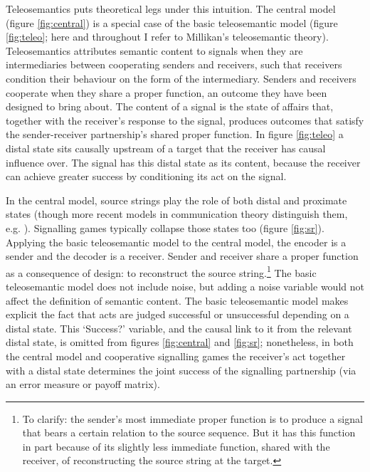 Teleosemantics puts theoretical legs under this intuition.
The central model (figure \ref{fig:central}) is a special case of the basic teleosemantic model (figure \ref{fig:teleo}; here and throughout I refer to Millikan's \parencite*[$\S$6]{millikan2004varieties} teleosemantic theory).
Teleosemantics attributes semantic content to signals when they are intermediaries between cooperating senders and receivers, such that receivers condition their behaviour on the form of the intermediary.
Senders and receivers cooperate when they share a proper function, an outcome they have been designed to bring about.
The content of a signal is the state of affairs that, together with the receiver's response to the signal, produces outcomes that satisfy the sender-receiver partnership's shared proper function.
In figure \ref{fig:teleo} a distal state sits causally upstream of a target that the receiver has causal influence over.
The signal has this distal state as its content, because the receiver can achieve greater success by conditioning its act on the signal.



In the central model, source strings play the role of both distal and proximate states (though more recent models in communication theory distinguish them, e.g. \citet{berger1996ceo}).
Signalling games typically collapse those states too (figure \ref{fig:sr}).
Applying the basic teleosemantic model to the central model, the encoder is a sender and the decoder is a receiver.
Sender and receiver share a proper function as a consequence of design: to reconstruct the source string.\footnote{To clarify: the sender's most immediate proper function is to produce a signal that bears a certain relation to the source sequence. But it has this function in part because of its slightly less immediate function, shared with the receiver, of reconstructing the source string at the target.}
The basic teleosemantic model does not include noise, but adding a noise variable would not affect the definition of semantic content.
The basic teleosemantic model makes explicit the fact that acts are judged successful or unsuccessful depending on a distal state.
This `Success?' variable, and the causal link to it from the relevant distal state, is omitted from figures \ref{fig:central} and \ref{fig:sr}; nonetheless, in both the central model and cooperative signalling games the receiver's act together with a distal state determines the joint success of the signalling partnership (via an error measure or payoff matrix).

